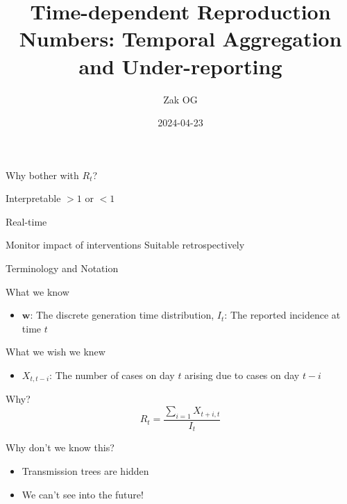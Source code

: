 \documentclass[
  ignorenonframetext,
]{beamer}
\title{Time-dependent Reproduction Numbers: Temporal Aggregation and
Under-reporting}
\author{Zak OG}
\date{2024-04-23}
\providecommand{\tightlist}{%
  \setlength{\itemsep}{0pt}\setlength{\parskip}{0pt}}
\begin{document}
\frame{\titlepage}

\begin{frame}{Why bother with \(R_t\)?}
\protect\hypertarget{why-bother-with-r_t}{}
\begin{block}{Interpretable}
\protect\hypertarget{interpretable}{}
\(>1\) or \(<1\)
\end{block}

\begin{block}{Real-time}
\protect\hypertarget{real-time}{}
\end{block}

\begin{block}{Monitor impact of interventions}
\protect\hypertarget{monitor-impact-of-interventions}{}
Suitable retrospectively
\end{block}
\end{frame}

\begin{frame}{Terminology and Notation}
\protect\hypertarget{terminology-and-notation}{}
\begin{block}{What we know}
\protect\hypertarget{what-we-know}{}
\begin{itemize}
\tightlist
\item
  \(\boldsymbol{w}\): The discrete generation time distribution,
  \(I_t\): The reported incidence at time \(t\)
\end{itemize}
\end{block}

\begin{block}{What we wish we knew}
\protect\hypertarget{what-we-wish-we-knew}{}
\begin{itemize}
\tightlist
\item
  \(X_{t, t-i}\): The number of cases on day \(t\) arising due to cases
  on day \(t-i\)
\end{itemize}
\end{block}

\begin{block}{Why?}
\protect\hypertarget{why}{}
\[R_t = \frac{\sum_{i=1}X_{t+i,t}}{I_t}\]
\end{block}

\begin{block}{Why don't we know this?}
\protect\hypertarget{why-dont-we-know-this}{}
\begin{itemize}
\tightlist
\item
  Transmission trees are hidden
\item
  We can't see into the future!
\end{itemize}
\end{block}
\end{frame}
\end{document}

